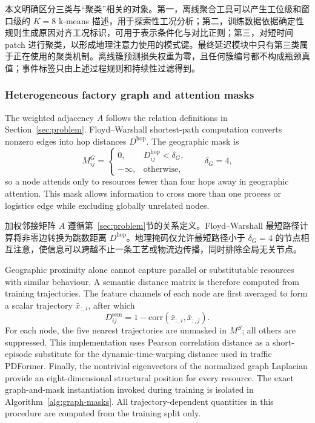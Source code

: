 \documentclass[a4paper,fleqn]{cas-dc}
\newcommand{\zhpara}[1]{%
  \par\begingroup\small\color{black!72}\noindent #1\par\endgroup}
\begin{document}
\zhpara{本文明确区分三类与“聚类”相关的对象。第一，离线聚合工具可以产生工位级和窗口级的 $K=8$ k-means 描述，用于探索性工况分析；第二，训练数据依据确定性规则生成原因对齐工况标识，可用于表示条件化与对比正则；第三，对短时间 patch 进行聚类，以形成地理注意力使用的模式键。最终延迟模块中只有第三类属于正在使用的聚类机制。离线簇预测损失权重为零，且任何簇编号都不构成瓶颈真值；事件标签只由上述过程规则和持续性过滤得到。}

\subsubsection{Heterogeneous factory graph and attention masks}

The weighted adjacency $A$ follows the relation definitions in Section~\ref{sec:problem}. Floyd--Warshall shortest-path computation converts nonzero edges into hop distances $D^{\mathrm{hop}}$. The geographic mask is
\begin{equation}
M^G_{ij}=
\begin{cases}
0, & D^{\mathrm{hop}}_{ij}<\delta_G,\\
-\infty, & \text{otherwise},
\end{cases}
\qquad \delta_G=4,
\end{equation}
so a node attends only to resources fewer than four hops away in geographic attention. This mask allows information to cross more than one process or logistics edge while excluding globally unrelated nodes.

\zhpara{加权邻接矩阵 $A$ 遵循第~\ref{sec:problem}节的关系定义。Floyd--Warshall 最短路径计算将非零边转换为跳数距离 $D^{\mathrm{hop}}$。地理掩码仅允许最短路径小于 $\delta_G=4$ 的节点相互注意，使信息可以跨越不止一条工艺或物流边传播，同时排除全局无关节点。}

Geographic proximity alone cannot capture parallel or substitutable resources with similar behaviour. A semantic distance matrix is therefore computed from training trajectories. The feature channels of each node are first averaged to form a scalar trajectory $\bar x_{:,i}$, after which
\begin{equation}
D^{\mathrm{sem}}_{ij}
=1-\mathrm{corr}(\bar{x}_{:,i},\bar{x}_{:,j}).
\end{equation}
For each node, the five nearest trajectories are unmasked in $M^S$; all others are suppressed. This implementation uses Pearson correlation distance as a short-episode substitute for the dynamic-time-warping distance used in traffic PDFormer. Finally, the nontrivial eigenvectors of the normalized graph Laplacian provide an eight-dimensional structural position for every resource. The exact graph-and-mask instantiation invoked during training is isolated in Algorithm~\ref{alg:graph-masks}. All trajectory-dependent quantities in this procedure are computed from the training split only.
\end{document}
